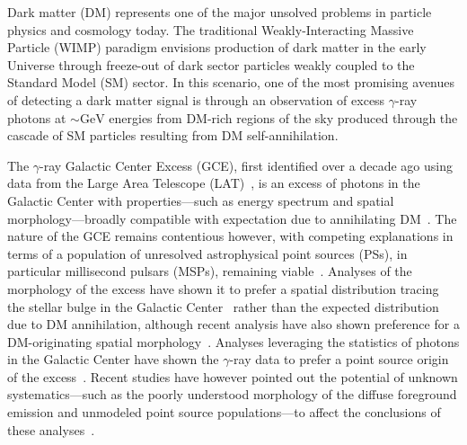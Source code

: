 \documentclass[prd,aps,10pt,nofootinbib,twocolumn,superscriptaddress,preprintnumbers,balancelastpage,longbibliography]{revtex4-1}
\begin{document}
Dark matter (DM) represents one of the major unsolved problems in particle physics and cosmology today. The traditional Weakly-Interacting Massive Particle (WIMP) paradigm envisions production of dark matter in the early Universe through freeze-out of dark sector particles weakly coupled to the Standard Model (SM) sector. In this scenario, one of the most promising avenues of detecting a dark matter signal is through an observation of excess $\gamma$-ray photons at $\sim\mathrm{GeV}$ energies from DM-rich regions of the sky produced through the cascade of SM particles resulting from DM self-annihilation. 

The \Fermi $\gamma$-ray Galactic Center Excess (GCE), first identified over a decade ago using data from the \Fermi Large Area Telescope (LAT)~\cite{Atwood:2009ez}, is an excess of photons in the Galactic Center with properties---such as energy spectrum and spatial morphology---broadly compatible with expectation due to annihilating DM~\cite{Goodenough:2009gk,Hooper:2010mq,Boyarsky:2010dr,Hooper:2011ti,Abazajian:2012pn,Hooper:2013rwa,Gordon:2013vta,Abazajian:2014fta,Daylan:2014rsa,Calore:2014xka,Abazajian:2014hsa,TheFermi-LAT:2015kwa,Linden:2016rcf,Macias:2016nev,Clark:2016mbb}. The nature of the GCE remains contentious however, with competing explanations in terms of a population of unresolved astrophysical point sources (PSs), in particular millisecond pulsars (MSPs), remaining viable~\cite{Abazajian:2014fta,Abazajian:2010zy,Hooper:2013nhl,Calore:2014oga,Cholis:2014lta,Petrovic:2014xra,Yuan:2014yda,Brandt:2015ula,Gautam:2021wqn,Ploeg:2020jeh}. Analyses of the morphology of the excess have shown it to prefer a spatial distribution tracing the stellar bulge in the Galactic Center~\cite{Macias:2016nev,Macias:2019omb,Bartels:2017vsx} rather than the expected distribution due to DM annihilation, although recent analysis have also shown preference for a DM-originating spatial morphology~\cite{DiMauro:2020rcr,DiMauro:2021raz}. Analyses leveraging the statistics of photons in the Galactic Center have shown the $\gamma$-ray data to prefer a point source origin of the excess~\cite{Lee:2015fea,Bartels:2015aea,Buschmann:2020adf,Chang:2019ars}. Recent studies have however pointed out the potential of unknown systematics---such as the poorly understood morphology of the diffuse foreground emission and unmodeled point source populations---to affect the conclusions of these analyses~\cite{Leane:2020nmi,Leane:2020pfc,Leane:2019xiy}.
\end{document}
